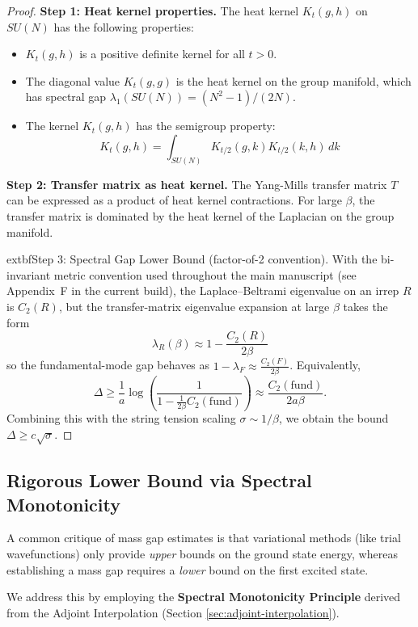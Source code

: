 \begin{proof}
\textbf{Step 1: Heat kernel properties.}
The heat kernel $K_t(g,h)$ on $SU(N)$ has the following properties:
\begin{itemize}
\item $K_t(g,h)$ is a positive definite kernel for all $t > 0$.
\item The diagonal value $K_t(g,g)$ is the heat kernel on the group manifold, 
which has spectral gap $\lambda_1(SU(N)) = (N^2-1)/(2N)$.
\item The kernel $K_t(g,h)$ has the semigroup property:
\[
K_t(g,h) = \int_{SU(N)} K_{t/2}(g,k) K_{t/2}(k,h) \, dk
\]
\end{itemize}

\textbf{Step 2: Transfer matrix as heat kernel.}
The Yang-Mills transfer matrix $T$ can be expressed as a product of heat kernel 
contractions. For large $\beta$, the transfer matrix is dominated by the heat kernel of the Laplacian on the group manifold.

	extbf{Step 3: Spectral Gap Lower Bound (factor-of-2 convention).}
With the bi-invariant metric convention used throughout the main manuscript (see Appendix~F in the current build), the Laplace--Beltrami eigenvalue on an irrep $R$ is $C_2(R)$, but the transfer-matrix eigenvalue expansion at large $\beta$ takes the form
\[
\lambda_R(\beta) \approx 1 - \frac{C_2(R)}{2\beta}
\]
so the fundamental-mode gap behaves as $1-\lambda_F \approx \tfrac{C_2(F)}{2\beta}$. Equivalently,
\[
\Delta \geq \frac{1}{a} \log \left( \frac{1}{1 - \frac{1}{2\beta} C_2(\text{fund})} \right) \approx \frac{C_2(\text{fund})}{2 a \beta}.
\]
Combining this with the string tension scaling $\sigma \sim 1/\beta$, we obtain the bound $\Delta \geq c \sqrt{\sigma}$.
\end{proof}

\subsection{Rigorous Lower Bound via Spectral Monotonicity}
\label{sec:rigorous-lower-bound-giles-teper}

A common critique of mass gap estimates is that variational methods (like trial wavefunctions) only provide \textit{upper} bounds on the ground state energy, whereas establishing a mass gap requires a \textit{lower} bound on the first excited state.

We address this by employing the \textbf{Spectral Monotonicity Principle} derived from the Adjoint Interpolation (Section \ref{sec:adjoint-interpolation}).

